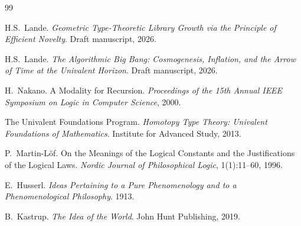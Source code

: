 \documentclass[11pt,a4paper]{article}
\theoremstyle{plain}
\theoremstyle{definition}
\theoremstyle{remark}
\begin{document}
\begin{thebibliography}{99}

H.S.\ Lande.
\emph{Geometric Type-Theoretic Library Growth via the Principle of Efficient Novelty}.
Draft manuscript, 2026.

H.S.\ Lande.
\emph{The Algorithmic Big Bang: Cosmogenesis, Inflation, and the Arrow of Time at the Univalent Horizon}.
Draft manuscript, 2026.

H.\ Nakano.
A Modality for Recursion.
\textit{Proceedings of the 15th Annual IEEE Symposium on Logic in Computer Science}, 2000.

The Univalent Foundations Program.
\emph{Homotopy Type Theory: Univalent Foundations of Mathematics}.
Institute for Advanced Study, 2013.

P.\ Martin-L\"of.
On the Meanings of the Logical Constants and the Justifications of the Logical Laws.
\textit{Nordic Journal of Philosophical Logic}, 1(1):11--60, 1996.

E.\ Husserl.
\emph{Ideas Pertaining to a Pure Phenomenology and to a Phenomenological Philosophy}.
1913.

B.\ Kastrup.
\emph{The Idea of the World}.
John Hunt Publishing, 2019.

\end{thebibliography}
\end{document}
